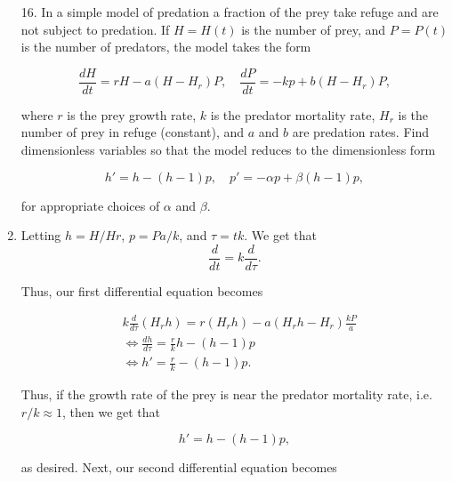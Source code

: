 \documentclass[12pt]{article}
\makeatletter
\theoremstyle{definition}
\theoremstyle{remark}
\newenvironment{solution}[1][\bf{\textit{Solution}}]{\par
  
  \normalfont \topsep6\p@\@plus6\p@\relax
  \list{}{\leftmargin=0mm
          \rightmargin=0mm
          \settowidth{\itemindent}{\itshape#1}%
          \labelwidth=\itemindent
          \parsep=0pt \listparindent=\parindent 
  }
  \item[\hskip\labelsep
        \itshape
    #1\@addpunct{.}]\ignorespaces
}{%
  \popQED\endlist\@endpefalse
}
\makeatother
\begin{document}
\begin{enumerate}[leftmargin=*]
    \item[16.] In a simple model of predation a fraction of the prey take refuge and are not subject to predation. If $H=H(t)$ is the number of prey, and $P=P(t)$ is the number of predators, the model takes the form 
    
    \begin{equation*}
        \frac{dH}{dt}=rH-a(H-H_r)P,\quad \frac{dP}{dt}=-kp+b(H-H_r)P,
    \end{equation*}
    
    where $r$ is the prey growth rate, $k$ is the predator mortality rate, $H_r$ is the number of prey in refuge (constant), and $a$ and $b$ are predation rates. Find dimensionless variables so that the model reduces to the dimensionless form 
    
    \begin{equation*}
        h'=h-(h-1)p,\quad p'=-\alpha p+\beta(h-1)p,
    \end{equation*}
    
    for appropriate choices of $\alpha$ and $\beta$.
    
    \begin{solution}
        Letting $h=H/Hr$, $p=Pa/k$, and $\tau = tk$. We get that 
        \begin{equation*}
            \frac{d}{dt}=k\frac{d}{d\tau}.
        \end{equation*}
        
        Thus, our first differential equation becomes 
        
        \begin{equation*}
            \begin{split}
                &k\frac{d}{d\tau}(H_rh)=r(H_rh)-a(H_rh-H_r)\frac{kP}{a} \\
                &\Leftrightarrow \frac{dh}{d\tau}= \frac{r}{k}h-(h-1)p \\
                &\Leftrightarrow h'=\frac{r}{k}-(h-1)p.
            \end{split}
        \end{equation*}
        
        Thus, if the growth rate of the prey is near the predator mortality rate, i.e. $r/k\approx 1$, then we get that 
        
        \begin{equation*}
            h'=h-(h-1)p,
        \end{equation*}
        
        as desired. Next, our second differential equation becomes
        

\end{solution}
\end{enumerate}
\end{document}
